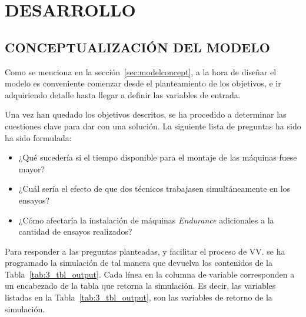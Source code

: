 
\section{DESARROLLO}

\subsection{CONCEPTUALIZACIÓN DEL MODELO}

Como se menciona en la sección~\ref{sec:modelconcept},
a la hora de diseñar el modelo
es conveniente comenzar desde el planteamiento de los objetivos,
e ir adquiriendo detalle hasta llegar a definir las variables de entrada.

Una vez han quedado los objetivos descritos,
se ha procedido a determinar las cuestiones clave para dar con una solución.
La siguiente lista de preguntas ha sido ha sido formulada:

\begin{itemize}
	\item ¿Qué sucedería si el tiempo disponible para el montaje de las máquinas fuese mayor? 
	\item ¿Cuál sería el efecto de que dos técnicos trabajasen simultáneamente en los ensayos?
	\item ¿Cómo afectaría la instalación de máquinas \textit{Endurance}
		adicionales a la cantidad de ensayos realizados?
\end{itemize}

Para responder a las preguntas planteadas, y facilitar el proceso de VV.
se ha programado la simulación de tal manera que devuelva
los contenidos de la Tabla~\ref{tab:3_tbl_output}.
Cada línea en la columna de variable corresponden
a un encabezado de la tabla que retorna la simulación.
Es decir, las variables listadas en la Tabla~\ref{tab:3_tbl_output},
son las variables de retorno de la simulación.

